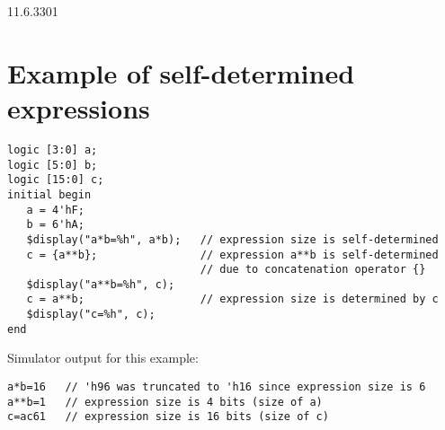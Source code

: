 \documentclass{article}
\newcommand{\del}{\color{darkred}}
\begin{document}
\begin{lrmquote}{11.6.3}{301}

  \section{Example of self-determined expressions}
  \label{examples}

  {
    \del{}
    \begin{verbatim}
logic [3:0] a;
logic [5:0] b;
logic [15:0] c;
initial begin
   a = 4'hF;
   b = 6'hA;
   $display("a*b=%h", a*b);   // expression size is self-determined
   c = {a**b};                // expression a**b is self-determined
                              // due to concatenation operator {}
   $display("a**b=%h", c);
   c = a**b;                  // expression size is determined by c
   $display("c=%h", c);
end
\end{verbatim}

    Simulator output for this example:
    \begin{verbatim}
a*b=16   // 'h96 was truncated to 'h16 since expression size is 6
a**b=1   // expression size is 4 bits (size of a)
c=ac61   // expression size is 16 bits (size of c)
\end{verbatim}

  }
\end{lrmquote}
\end{document}
